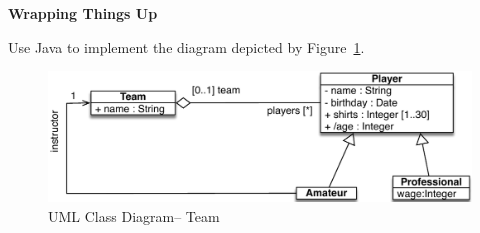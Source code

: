 \documentclass[a4paper,11pt]{memoir}
\begin{document}
\begin{solution}
		\lstset{language=Java}
		
			
\end{solution}

\begin{question}
	\textbf{Wrapping Things Up}
	
	Use Java to implement the diagram depicted by Figure~\ref{fig:team}.

	\begin{figure}[htbp]
		\centering
			\includegraphics[width=.8\linewidth]{Team}
		\caption{UML Class Diagram\--- Team}
		\label{fig:team}
	\end{figure}
	
\end{question}
\end{document}

